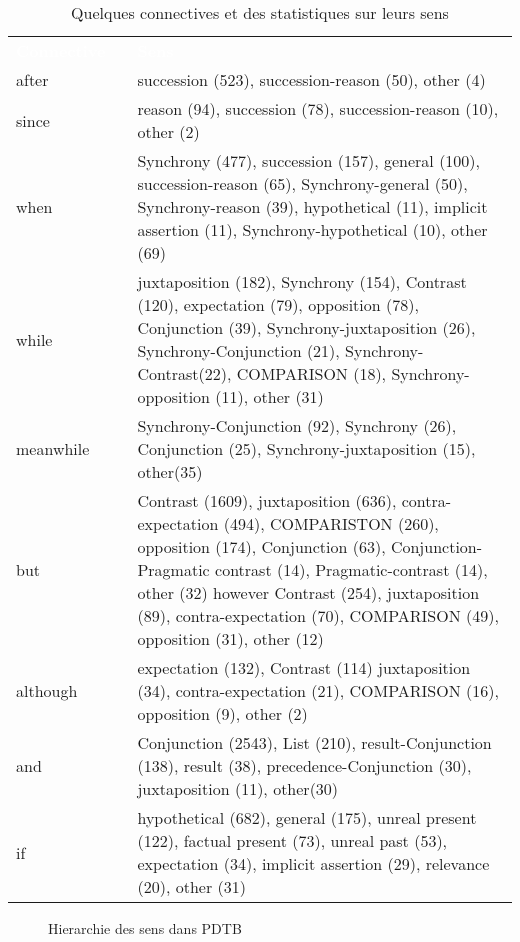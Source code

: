 \documentclass{KodeBook}
\begin{document}
\begin{table}
	\tiny\bfseries
	\begin{tabular}{p{}lp{}}
		\rowcolor{darkblue}
		\bfseries\textcolor{white}{Connective} && \bfseries\textcolor{white}{Sens}\\
		
		after && succession (523), succession-reason (50), other (4) \\
		since && reason (94), succession (78), succession-reason (10), other (2) \\
		when && Synchrony (477), succession (157), general (100), succession-reason (65), Synchrony-general (50),
		Synchrony-reason (39), hypothetical (11), implicit assertion (11), Synchrony-hypothetical (10), other
		(69) \\
		while && juxtaposition (182), Synchrony (154), Contrast (120), expectation (79), opposition (78), Conjunction
		(39), Synchrony-juxtaposition (26), Synchrony-Conjunction (21), Synchrony-Contrast(22), COMPARISON (18), Synchrony-opposition (11), other (31) \\
		meanwhile && Synchrony-Conjunction (92), Synchrony (26), Conjunction (25), Synchrony-juxtaposition (15),
		other(35)\\
		but && Contrast (1609), juxtaposition (636), contra-expectation (494), COMPARISTON (260), opposition
		(174), Conjunction (63), Conjunction-Pragmatic contrast (14), Pragmatic-contrast (14), other (32)
		however Contrast (254), juxtaposition (89), contra-expectation (70), COMPARISON (49), opposition (31),
		other (12)\\
		although && expectation (132), Contrast (114) juxtaposition (34), contra-expectation (21), COMPARISON (16),
		opposition (9), other (2)\\
		and && Conjunction (2543), List (210), result-Conjunction (138), result (38), precedence-Conjunction (30),
		juxtaposition (11), other(30)\\
		if && hypothetical (682), general (175), unreal present (122), factual present (73), unreal past (53), expectation (34), implicit assertion (29), relevance (20), other (31)\\
	\end{tabular}
	\caption{Quelques connectives et des statistiques sur leurs sens \cite{2008-prasad-al}}
\end{table}

\begin{figure}
	\caption{Hierarchie des sens dans PDTB \cite{2008-prasad-al}}
\end{figure}
\end{document}
